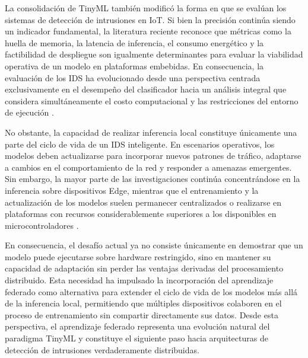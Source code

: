 \documentclass[journal,article,submit,moreauthors]{Definitions/mdpi}
\begin{document}
La consolidación de TinyML también modificó la forma en que se evalúan los sistemas de detección de intrusiones en IoT. Si bien la precisión continúa siendo un indicador fundamental, la literatura reciente reconoce que métricas como la huella de memoria, la latencia de inferencia, el consumo energético y la factibilidad de despliegue son igualmente determinantes para evaluar la viabilidad operativa de un modelo en plataformas embebidas. En consecuencia, la evaluación de los IDS ha evolucionado desde una perspectiva centrada exclusivamente en el desempeño del clasificador hacia un análisis integral que considera simultáneamente el costo computacional y las restricciones del entorno de ejecución \cite{Tekin2023,Amuthadevi2025,Dini2024,Heydari2024}.
%

No obstante, la capacidad de realizar inferencia local constituye únicamente una parte del ciclo de vida de un IDS inteligente. En escenarios operativos, los modelos deben actualizarse para incorporar nuevos patrones de tráfico, adaptarse a cambios en el comportamiento de la red y responder a amenazas emergentes. Sin embargo, la mayor parte de las investigaciones continúa concentrándose en la inferencia sobre dispositivos Edge, mientras que el entrenamiento y la actualización de los modelos suelen permanecer centralizados o realizarse en plataformas con recursos considerablemente superiores a los disponibles en microcontroladores \cite{Ficco2024,Ramadan2025}.
%

En consecuencia, el desafío actual ya no consiste únicamente en demostrar que un modelo puede ejecutarse sobre hardware restringido, sino en mantener su capacidad de adaptación sin perder las ventajas derivadas del procesamiento distribuido. Esta necesidad ha impulsado la incorporación del aprendizaje federado como alternativa para extender el ciclo de vida de los modelos más allá de la inferencia local, permitiendo que múltiples dispositivos colaboren en el proceso de entrenamiento sin compartir directamente sus datos. Desde esta perspectiva, el aprendizaje federado representa una evolución natural del paradigma TinyML y constituye el siguiente paso hacia arquitecturas de detección de intrusiones verdaderamente distribuidas.
\end{document}
